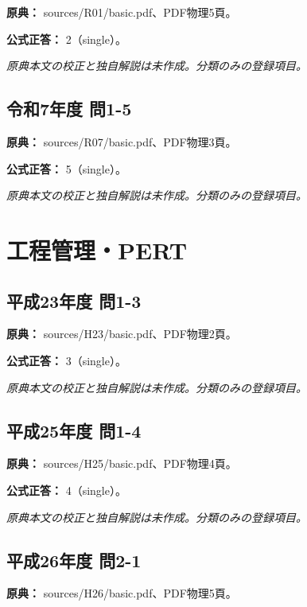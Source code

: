 \noindent\textbf{原典：} sources/R01/basic.pdf、PDF物理5頁。

\textbf{公式正答：} 2（single）。

\par\textit{原典本文の校正と独自解説は未作成。分類のみの登録項目。}

\subsection{令和7年度 問1-5}
\label{q:r07-reg-basic-1-5}

\noindent\textbf{原典：} sources/R07/basic.pdf、PDF物理3頁。

\textbf{公式正答：} 5（single）。

\par\textit{原典本文の校正と独自解説は未作成。分類のみの登録項目。}

\section{工程管理・PERT}

\subsection{平成23年度 問1-3}
\label{q:h23-reg-basic-1-3}

\noindent\textbf{原典：} sources/H23/basic.pdf、PDF物理2頁。

\textbf{公式正答：} 3（single）。

\par\textit{原典本文の校正と独自解説は未作成。分類のみの登録項目。}

\subsection{平成25年度 問1-4}
\label{q:h25-reg-basic-1-4}

\noindent\textbf{原典：} sources/H25/basic.pdf、PDF物理4頁。

\textbf{公式正答：} 4（single）。

\par\textit{原典本文の校正と独自解説は未作成。分類のみの登録項目。}

\subsection{平成26年度 問2-1}
\label{q:h26-reg-basic-2-1}

\noindent\textbf{原典：} sources/H26/basic.pdf、PDF物理5頁。

